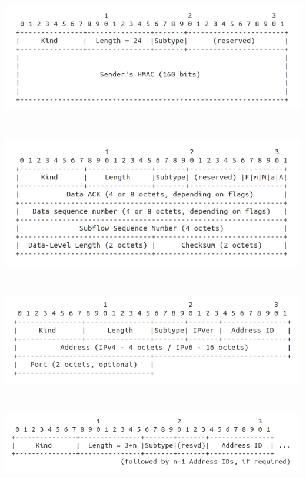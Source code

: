 \begin{minipage}[c]{\textwidth}

\includegraphics[width=\textwidth]{Figures/mpjoinformat3.png}
\end{minipage} \\

\begin{minipage}[c]{\textwidth}
\includegraphics[width=\textwidth]{Figures/mpdssformat.png}
\end{minipage} \\

\begin{minipage}[c]{\textwidth}

\includegraphics[width=\textwidth]{Figures/mpaddformat.png}
\end{minipage} \\

\begin{minipage}[c]{\textwidth}

\includegraphics[width=\textwidth]{Figures/mpremoveformat.png}
\end{minipage} \\

